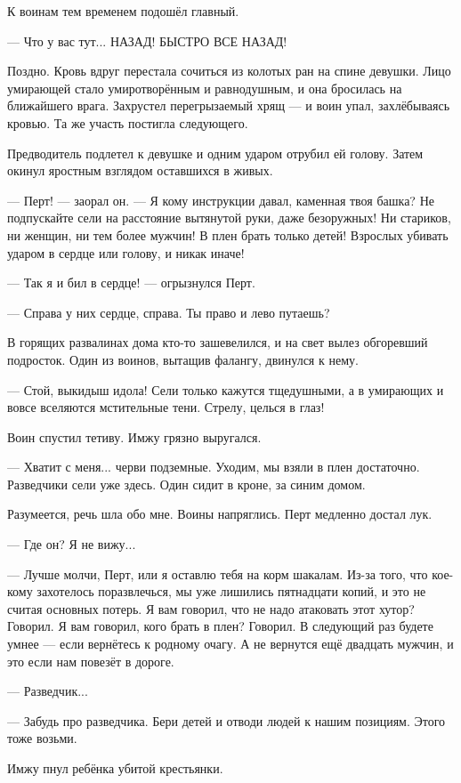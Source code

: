К воинам тем временем подошёл главный.

--- Что у вас тут... НАЗАД!
БЫСТРО ВСЕ НАЗАД!

Поздно.
Кровь вдруг перестала сочиться из колотых ран на спине девушки.
Лицо умирающей стало умиротворённым и равнодушным, и она бросилась на ближайшего врага.
Захрустел перегрызаемый хрящ --- и воин упал, захлёбываясь кровью.
Та же участь постигла следующего.

Предводитель подлетел к девушке и одним ударом отрубил ей голову.
Затем окинул яростным взглядом оставшихся в живых.

--- Перт! --- заорал он.
--- Я кому инструкции давал, каменная твоя башка?
Не подпускайте сели на расстояние вытянутой руки, даже безоружных!
Ни стариков, ни женщин, ни тем более мужчин!
В плен брать только детей!
Взрослых убивать ударом в сердце или голову, и никак иначе!

--- Так я и бил в сердце! --- огрызнулся Перт.

--- Справа у них сердце, справа.
Ты право и лево путаешь?

В горящих развалинах дома кто-то зашевелился, и на свет вылез обгоревший подросток.
Один из воинов, вытащив фалангу, двинулся к нему.

--- Стой, выкидыш идола!
Сели только кажутся тщедушными, а в умирающих и вовсе вселяются мстительные тени.
Стрелу, целься в глаз!

Воин спустил тетиву.
Имжу грязно выругался.

--- Хватит с меня... черви подземные.
Уходим, мы взяли в плен достаточно.
Разведчики сели уже здесь.
Один сидит в кроне, за синим домом.

Разумеется, речь шла обо мне.
Воины напряглись.
Перт медленно достал лук.

--- Где он?
Я не вижу...

--- Лучше молчи, Перт, или я оставлю тебя на корм шакалам.
Из-за того, что кое-кому захотелось поразвлечься, мы уже лишились пятнадцати копий, и это не считая основных потерь.
Я вам говорил, что не надо атаковать этот хутор?
Говорил.
Я вам говорил, кого брать в плен?
Говорил.
В следующий раз будете умнее --- если вернётесь к родному очагу.
А не вернутся ещё двадцать мужчин, и это если нам повезёт в дороге.

--- Разведчик...

--- Забудь про разведчика.
Бери детей и отводи людей к нашим позициям.
Этого тоже возьми.

Имжу пнул ребёнка убитой крестьянки.

